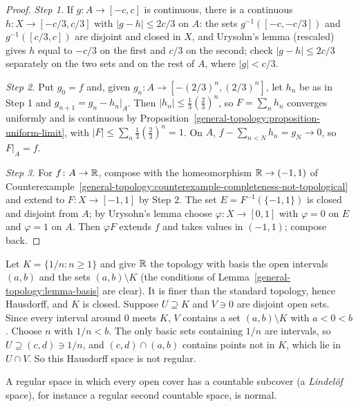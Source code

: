 \begin{proof}
\emph{Step 1.} If $g \colon A \to [-c, c]$ is continuous, there is a continuous $h \colon X \to [-c/3, c/3]$ with $|g - h| \leq 2c/3$ on $A$: the sets
$g^{-1}([-c, -c/3])$ and $g^{-1}([c/3, c])$ are disjoint and closed in $X$, and Urysohn's lemma (rescaled) gives $h$ equal to $-c/3$ on the first and
$c/3$ on the second; check $|g - h| \leq 2c/3$ separately on the two sets and on the rest of $A$, where $|g| < c/3$.

\emph{Step 2.} Put $g_0 = f$ and, given $g_n \colon A \to [-(2/3)^n, (2/3)^n]$, let $h_n$ be as in Step 1 and $g_{n+1} = g_n - h_n|_A$. Then
$|h_n| \leq \frac{1}{3}(\frac{2}{3})^n$, so $F = \sum_n h_n$ converges uniformly and is continuous by
Proposition~\ref{general-topology:proposition-uniform-limit}, with $|F| \leq \sum_n \frac13(\frac23)^n = 1$. On $A$,
$f - \sum_{n < N} h_n = g_N \to 0$, so $F|_A = f$.

\emph{Step 3.} For $f \colon A \to \mathbb{R}$, compose with the homeomorphism $\mathbb{R} \to (-1, 1)$ of
Counterexample~\ref{general-topology:counterexample-completeness-not-topological} and extend to $F \colon X \to [-1, 1]$ by Step 2. The set
$E = F^{-1}(\{-1, 1\})$ is closed and disjoint from $A$; by Urysohn's lemma choose $\varphi \colon X \to [0, 1]$ with $\varphi = 0$ on $E$ and $\varphi = 1$ on
$A$. Then $\varphi F$ extends $f$ and takes values in $(-1, 1)$; compose back.
\end{proof}

\begin{counterexample}\label{general-topology:counterexample-hausdorff-not-regular}
Let $K = \{1/n : n \geq 1\}$ and give $\mathbb{R}$ the topology with basis the open intervals $(a, b)$ and the sets $(a, b) \setminus K$ (the conditions of
Lemma~\ref{general-topology:lemma-basis} are clear). It is finer than the standard topology, hence Hausdorff, and $K$ is closed. Suppose $U \supseteq K$
and $V \ni 0$ are disjoint open sets. Since every interval around $0$ meets $K$, $V$ contains a set $(a, b) \setminus K$ with $a < 0 < b$. Choose $n$ with
$1/n < b$. The only basic sets containing $1/n$ are intervals, so $U \supseteq (c, d) \ni 1/n$, and $(c, d) \cap (a, b)$ contains points not in $K$, which lie in
$U \cap V$. So this Hausdorff space is not regular.
\end{counterexample}

\begin{lemma}[Tychonoff]\label{general-topology:lemma-regular-lindelof-normal}
A regular space in which every open cover has a countable subcover (a \emph{Lindel\"of} space), for instance a regular second countable space, is normal.
\end{lemma}

